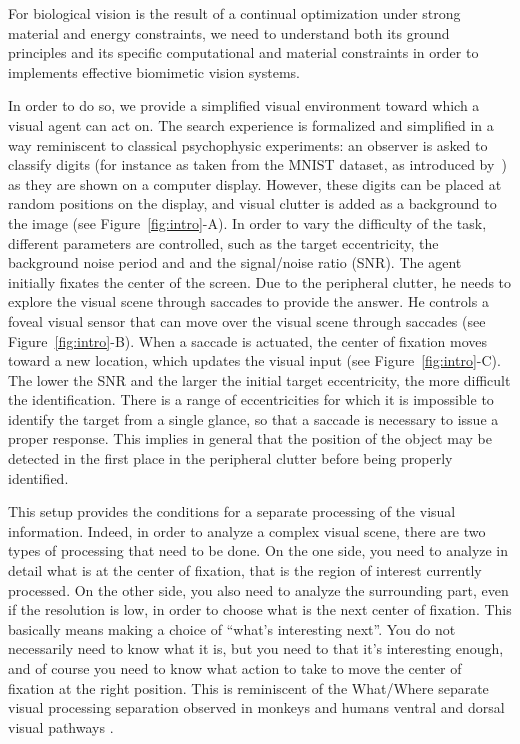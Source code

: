 
For biological vision is the result of a continual optimization under strong material and energy constraints, we need to understand both its ground principles and its specific computational and material constraints in order to implements effective biomimetic vision systems.

In order to do so, we provide a simplified visual environment toward which a visual agent can act on.
The search experience is formalized and simplified in a way reminiscent to classical psychophysic experiments: an observer is asked to classify digits (for instance as taken from the MNIST dataset, as introduced by~\cite{Lecun1998}) as they are shown on a computer display.
However, these digits can be placed at random positions on the display, and visual clutter is added as a background to the image (see Figure~\ref{fig:intro}-A).
In order to vary the difficulty of the task, different parameters are controlled, such as the target eccentricity, the background noise period and and the signal/noise ratio (SNR).
The agent initially fixates the center of the screen. Due to the peripheral clutter, he needs to explore the visual scene through saccades to provide the answer. He controls a foveal visual sensor that can move over the visual scene through saccades (see Figure~\ref{fig:intro}-B). When a saccade is actuated, the center of fixation moves toward a new location, which updates the visual input (see Figure~\ref{fig:intro}-C).
The lower the SNR and the larger the initial target eccentricity, the more difficult the identification. There is a range of eccentricities for which it is impossible to identify the target from a single glance, so that a saccade is necessary to issue a proper response.
This implies in general that the position of the object may be detected in the first place in the peripheral clutter before being properly identified. 

This setup provides the conditions for a separate processing of the visual information.
Indeed, in order to analyze a complex visual scene, there are two types of processing that need to be done. On the one side, you need  to analyze in detail what is at the center of fixation, that is the region of interest currently processed. On the other side, you also need to analyze the surrounding part, even if the resolution is low, in order to choose what is the next center of fixation. This basically means making a choice of “what’s interesting next”. You do not necessarily need to know what it is, but you need to that it’s interesting enough, and of course you need to know what action to take to move the center of fixation at the right position. This is reminiscent of the What/Where separate visual processing separation observed in monkeys and humans ventral and dorsal visual pathways \cite{mishkin1983object}.


